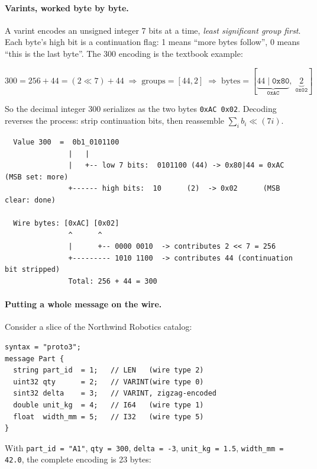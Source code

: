 \paragraph{Varints, worked byte by byte.}
A varint encodes an unsigned integer 7 bits at a time, \emph{least significant group
first}. Each byte's high bit is a continuation flag: 1 means ``more bytes follow'',
0 means ``this is the last byte''. The 300 encoding is the textbook example:

\[
300 = 256 + 44 = (2 \ll 7) + 44
\;\Longrightarrow\;
\text{groups} = [44, 2]
\;\Longrightarrow\;
\text{bytes} = [\underbrace{44 \mathbin{|} \texttt{0x80}}_{\texttt{0xAC}},\;
                \underbrace{2}_{\texttt{0x02}}]
\]

So the decimal integer 300 serializes as the two bytes \texttt{0xAC 0x02}. Decoding
reverses the process: strip continuation bits, then reassemble
$\sum_i b_i \ll (7i)$.

\begin{verbatim}
  Value 300  =  0b1_0101100
               |   |
               |   +-- low 7 bits:  0101100 (44) -> 0x80|44 = 0xAC (MSB set: more)
               +------ high bits:  10      (2)  -> 0x02      (MSB clear: done)

  Wire bytes: [0xAC] [0x02]
               ^      ^
               |      +-- 0000 0010  -> contributes 2 << 7 = 256
               +--------- 1010 1100  -> contributes 44 (continuation bit stripped)
               Total: 256 + 44 = 300
\end{verbatim}

\paragraph{Putting a whole message on the wire.}
Consider a slice of the Northwind Robotics catalog:

\begin{verbatim}
syntax = "proto3";
message Part {
  string part_id  = 1;   // LEN   (wire type 2)
  uint32 qty      = 2;   // VARINT(wire type 0)
  sint32 delta    = 3;   // VARINT, zigzag-encoded
  double unit_kg  = 4;   // I64   (wire type 1)
  float  width_mm = 5;   // I32   (wire type 5)
}
\end{verbatim}

With \texttt{part\_id = "A1"}, \texttt{qty = 300}, \texttt{delta = -3},
\texttt{unit\_kg = 1.5}, \texttt{width\_mm = 42.0}, the complete encoding is 23 bytes:


